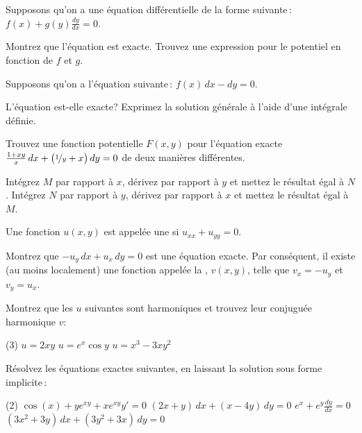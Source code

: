 \begin{exercise}
Supposons qu'on a une équation différentielle de la forme suivante\,: 
$f(x) + g(y) \frac{dy}{dx} = 0$.
\begin{tasks}
\task
Montrez que l'équation est exacte.
\task
Trouvez une expression pour le potentiel en fonction de $f$ et $g$.
\end{tasks}
\end{exercise}

\begin{exercise}
Supposons qu'on a l'équation suivante\,: $f(x) \, dx - dy = 0$.
\begin{tasks}
\task
L'équation est-elle exacte?
\task
Exprimez la solution générale à l'aide d'une intégrale définie.
\end{tasks}
\end{exercise}

\begin{exercise}
Trouvez une fonction potentielle $F(x,y)$ pour l'équation exacte $\frac{1+xy}{x}\, dx +
\bigl(\nicefrac{1}{y} + x \bigr) \, dy = 0$ de deux manières différentes.
\begin{tasks}
\task
Intégrez $M$ par rapport à $x$, dérivez par rapport à $y$ et mettez le résultat égal à
$N$.
\task
Intégrez $N$ par rapport à $y$, dérivez par rapport à $x$ et mettez le résultat égal à 
$M$.
\end{tasks}
\end{exercise}

\begin{samepage}
\begin{exercise}
Une fonction $u(x,y)$ est appelée une \emph{} si
$u_{xx} + u_{yy} = 0$.
\begin{tasks}
\task
Montrez que $-u_y \, dx + u_x \, dy = 0$ est une équation exacte.  Par conséquent, il  existe (au moins localement)
une fonction appelée la \emph{},
$v(x,y)$, telle que $v_x = -u_y$ et $v_y = u_x$.
\end{tasks}
Montrez que les $u$ suivantes sont harmoniques et trouvez leur conjuguée harmonique $v$:
\begin{tasks}[resume](3)
\task $u = 2xy$
\task $u = e^x \cos y$
\task $u = x^3-3xy^2$
\end{tasks}
\end{exercise}
\end{samepage}

\setcounter{exercise}{100}

\begin{exercise}
Résolvez les équations exactes suivantes, en laissant la solution sous forme implicite\,:
\begin{tasks}(2)
\task
$\cos(x)+ye^{xy} + xe^{xy} y' = 0$
\task
$(2x+y)\, dx + (x-4y) \, dy = 0$
\task
$e^x + e^y \frac{dy}{dx} = 0$
\task
$(3x^2+3y)\,dx + (3y^2+3x)\, dy = 0$
\end{tasks}
\end{exercise}



